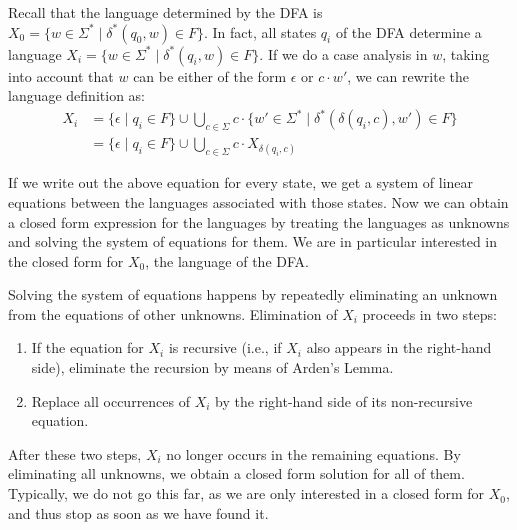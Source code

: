 Recall that the language determined by the DFA is $X_0 = \{ w \in \Sigma^* \mid \delta^*(q_0, w) \in F\}$.
In fact, all states $q_i$ of the DFA determine a language $X_i = \{ w \in \Sigma^* \mid \delta^*(q_i, w) \in F\}$.
If we do a case analysis in $w$, taking into account that $w$ can be either of the form $\epsilon$ or $c \cdot w'$,
we can rewrite the language definition as:
\begin{equation*}\begin{split}
	X_i &= \{ \epsilon \mid q_i \in F\} \cup \bigcup_{c \in \Sigma} c \cdot \{  w ' \in \Sigma^* \mid \delta^*(\delta(q_i,c), w') \in F\} \\
	&= \{ \epsilon \mid q_i \in F\} \cup \bigcup_{c \in \Sigma} c \cdot X_{\delta(q_i,c)}
\end{split}
\end{equation*}

If we write out the above equation for every state, we get a system of linear equations between the languages associated with those states. Now we can obtain a closed form expression for the languages by treating the languages as unknowns and solving the system of equations for them. We are in particular interested in the closed form for $X_0$, the language of the DFA.

Solving the system of equations happens by repeatedly eliminating an unknown
from the equations of other unknowns. Elimination of $X_i$ proceeds in two steps:
\begin{enumerate}
	\item If the equation for $X_i$ is recursive (i.e., if $X_i$ also appears in the right-hand side), eliminate the recursion by means of Arden's Lemma.
	\item Replace all occurrences of $X_i$ by the right-hand side of its non-recursive equation.
\end{enumerate}
After these two steps, $X_i$ no longer occurs in the remaining equations.
By eliminating all unknowns, we obtain a closed form solution for all of them.
Typically, we do not go this far, as we are only interested in a closed form for $X_0$,
and thus stop as soon as we have found it.

